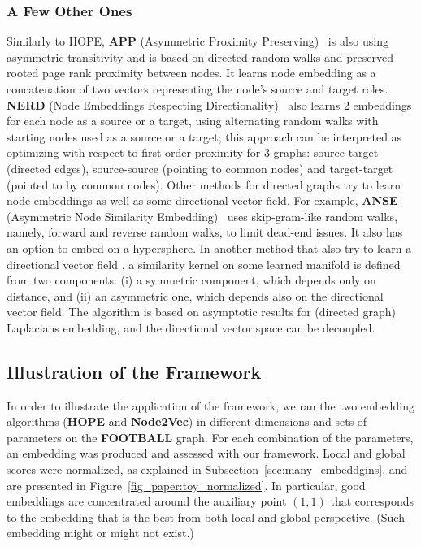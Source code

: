 \documentclass[11pt]{article}
\begin{document}
\subsubsection{A Few Other Ones}

Similarly to HOPE, \textbf{APP} (Asymmetric Proximity Preserving)~\cite{Zhou2017} is also using asymmetric transitivity and is based on directed random walks and preserved rooted page rank proximity between nodes. It learns node embedding as a concatenation of two vectors representing the node's source and target roles.
\textbf{NERD} (Node Embeddings Respecting Directionality)~\cite{Khosla2020}
also learns 2 embeddings for each node as a source or a target,
using alternating random walks with starting nodes used as a source or a target;
this approach can be interpreted as optimizing with respect to first order proximity for 3 graphs: source-target (directed edges), source-source (pointing to common nodes) and target-target (pointed to by common nodes).
Other methods for directed graphs try to learn node embeddings as well as some directional vector field. For example, \textbf{ANSE} (Asymmetric Node Similarity Embedding)~\cite{Dernbach2020}
uses skip-gram-like random walks, namely, forward and reverse random walks, to limit dead-end issues. It also has an option to embed on a hypersphere.
In another method that also try to learn a directional vector field \cite{Perrault2011}, a similarity kernel on some learned manifold is defined from two components: (i) a symmetric component, which depends only on distance, and (ii) an asymmetric one, which depends also on the directional vector field. The algorithm is based on asymptotic results for (directed graph) Laplacians embedding, and the directional vector space can be decoupled.

\subsection{Illustration of the Framework}\label{sec:toy_example}

In order to illustrate the application of the framework, we ran the two embedding algorithms (\textbf{HOPE} and \textbf{Node2Vec}) in different dimensions and sets of parameters on the \textbf{FOOTBALL} graph. For each combination of the parameters, an embedding was produced and assessed with our framework. Local and global scores were normalized, as explained in Subsection~\ref{sec:many_embeddgins}, and are presented in Figure~\ref{fig_paper:toy_normalized}. In particular, good embeddings are concentrated around the auxiliary point $(1,1)$ that corresponds to the embedding that is the best from both local and global perspective. (Such embedding might or might not exist.) 
\end{document}
